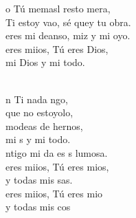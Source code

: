 \documentclass[12pt]{article}
\begin{document}
\begin{multicols*}{2}
\begin{cancion}
	o Tú memasl resto mera,\\
	 Ti estoy vao, sé quey tu obra. \\
	 eres mi deanso, miz y mi oyo.\\
	 eres miios, Tú eres Dios,\\
mi Dios y mi todo.\\\jump\\
	\begin{chorus}%
	n Ti nada ngo,\\
	 que no estoyolo,\\
	modeas de hernos, \\
	mi s y mi todo.\\
	ntigo mi da es s lumosa.\\
	 eres miios, Tú eres mios,\\
	y todas mis sas.\\
	 eres miios, Tú eres mio\\
	y todas mis cos\\
	\end{chorus}%
	\jump\\
	       \\
\end{cancion}%


\end{multicols*}
\end{document}
